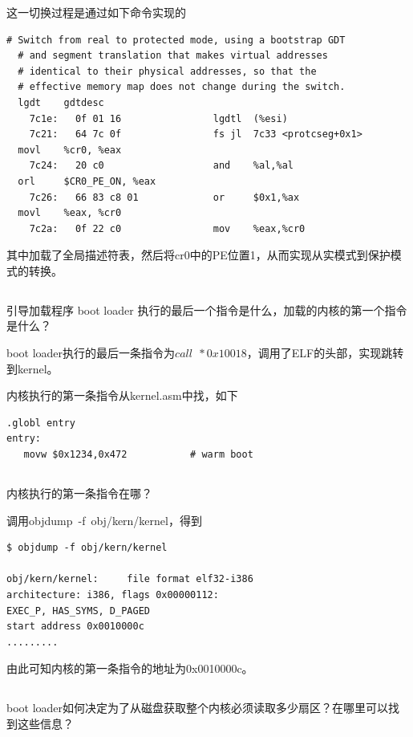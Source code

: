 \documentclass[12pt,a4paper,UTF8]{article}
\begin{document}
	这一切换过程是通过如下命令实现的
	\begin{lstlisting}[style=MASM]
  # Switch from real to protected mode, using a bootstrap GDT
  # and segment translation that makes virtual addresses 
  # identical to their physical addresses, so that the 
  # effective memory map does not change during the switch.
  lgdt    gdtdesc
    7c1e:	0f 01 16             	lgdtl  (%esi)
    7c21:	64 7c 0f             	fs jl  7c33 <protcseg+0x1>
  movl    %cr0, %eax
    7c24:	20 c0                	and    %al,%al
  orl     $CR0_PE_ON, %eax
    7c26:	66 83 c8 01          	or     $0x1,%ax
  movl    %eax, %cr0
    7c2a:	0f 22 c0             	mov    %eax,%cr0
	\end{lstlisting}

	其中加载了全局描述符表，然后将cr0中的PE位置1，从而实现从实模式到保护模式的转换。

    \subsection{}
	引导加载程序 boot loader 执行的最后一个指令是什么，加载的内核的第一个指令是什么？

	boot loader执行的最后一条指令为$call\ \ *0x10018$，调用了ELF的头部，实现跳转到kernel。

	内核执行的第一条指令从kernel.asm中找，如下
	\begin{lstlisting}[style=MASM]
.globl entry
entry:
   movw	$0x1234,0x472			# warm boot
	\end{lstlisting}
    \subsection{}
	内核执行的第一条指令在哪？

	调用objdump\ -f\ obj/kern/kernel，得到
	\begin{lstlisting}[style=BASH]
$ objdump -f obj/kern/kernel

obj/kern/kernel:     file format elf32-i386
architecture: i386, flags 0x00000112:
EXEC_P, HAS_SYMS, D_PAGED
start address 0x0010000c
.........
	\end{lstlisting}

	由此可知内核的第一条指令的地址为0x0010000c。

	\subsection{}
	boot loader如何决定为了从磁盘获取整个内核必须读取多少扇区？在哪里可以找到这些信息？
\end{document}
